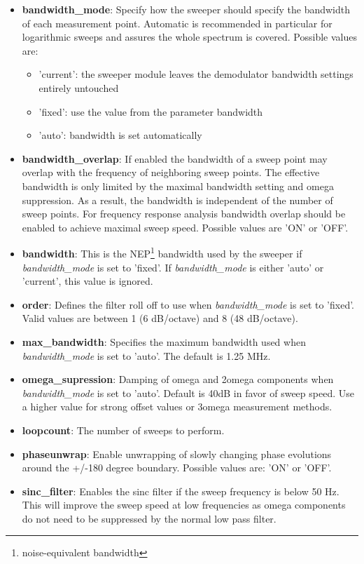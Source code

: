 \documentclass[11pt]{article} %
\begin{document}
\begin{itemize}
\item {\bf bandwidth\_mode}: Specify how the sweeper should specify the bandwidth of each measurement point. Automatic is recommended in particular for logarithmic sweeps and assures the whole spectrum is covered. Possible values are:
	\begin{itemize}[]
	\itemsep0pt
	\item 'current': the sweeper module leaves the demodulator bandwidth settings entirely untouched
	\item 'fixed': use the value from the parameter bandwidth
	\item 'auto': bandwidth is set automatically
	\end{itemize}
\item {\bf bandwidth\_overlap}: If enabled the bandwidth of a sweep point may overlap with the frequency of neighboring sweep points. The effective bandwidth is only limited by the maximal bandwidth setting and omega suppression. As a result, the bandwidth is independent of the number of sweep points. For frequency response analysis bandwidth overlap should be enabled to achieve maximal sweep speed. Possible values are 'ON' or 'OFF'.
\item {\bf bandwidth}: This is the NEP\footnote{noise-equivalent bandwidth} bandwidth used by the sweeper if {\it bandwidth\_mode} is set to 'fixed'. If {\it bandwidth\_mode} is either 'auto' or 'current', this value is ignored.
\item {\bf order}: Defines the filter roll off to use when {\it bandwidth\_mode} is set to 'fixed'. Valid values are between 1 (6 dB/octave) and 8 (48 dB/octave).
\item {\bf max\_bandwidth}: Specifies the maximum bandwidth used when {\it bandwidth\_mode} is set to 'auto'. The default is 1.25 MHz.
\item {\bf omega\_supression}: Damping of omega and 2omega components when {\it bandwidth\_mode} is set to 'auto'. Default is 40dB in favor of sweep speed. Use a higher value for strong offset values or 3omega measurement methods.
\item {\bf loopcount}: The number of sweeps to perform.
\item {\bf phaseunwrap}: Enable unwrapping of slowly changing phase evolutions around the +/-180 degree boundary. Possible values are: 'ON' or 'OFF'.
\item {\bf sinc\_filter}: Enables the sinc filter if the sweep frequency is below 50 Hz. This will improve the sweep speed at low frequencies as omega components do not need to be suppressed by the normal low pass filter.

\end{itemize}
\end{document}

